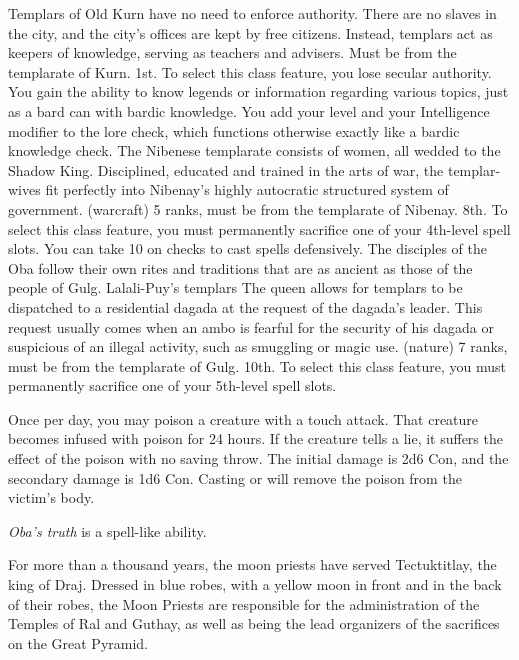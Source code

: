 {Templars of Old Kurn have no need to enforce authority. There are no slaves in the city, and the city's offices are kept by free citizens. Instead, templars act as keepers of knowledge, serving as teachers and advisers.}
{Must be from the templarate of Kurn.}
{1st.}
{To select this class feature, you lose secular authority.}
{
	You gain the ability to know legends or information regarding various topics, just as a bard can with bardic knowledge. You add your level and your Intelligence modifier to the lore check, which functions otherwise exactly like a bardic knowledge check.
}
{The Nibenese templarate consists of women, all wedded to the Shadow King. Disciplined, educated and trained in the arts of war, the templar-wives fit perfectly into Nibenay's highly autocratic structured system of government.}
{ (warcraft) 5 ranks, must be from the templarate of Nibenay.}
{8th.}
{To select this class feature, you must permanently sacrifice one of your 4th-level spell slots.}
{
	You can take 10 on  checks to cast spells defensively.
}
{The disciples of the Oba follow their own rites and traditions that are as ancient as those of the people of Gulg. Lalali-Puy's templars  The queen allows for templars to be dispatched to a residential dagada at the request of the dagada's leader. This request usually comes when an ambo is fearful for the security of his dagada or suspicious of an illegal activity, such as smuggling or magic use.}
{ (nature) 7 ranks, must be from the templarate of Gulg.}
{10th.}
{To select this class feature, you must permanently sacrifice one of your 5th-level spell slots.}
{
	Once per day, you may poison a creature with a touch attack. That creature becomes infused with poison for 24 hours. If the creature tells a lie, it suffers the effect of the poison with no saving throw. The initial damage is 2d6 Con, and the secondary damage is 1d6 Con. Casting  or  will remove the poison from the victim's body.

	\emph{Oba's truth} is a spell-like ability.
}
{For more than a thousand years, the moon priests have served Tectuktitlay, the king of Draj. Dressed in blue robes, with a yellow moon in front and in the back of their robes, the Moon Priests are responsible for the administration of the Temples of Ral and Guthay, as well as being the lead organizers of the sacrifices on the Great Pyramid.}
